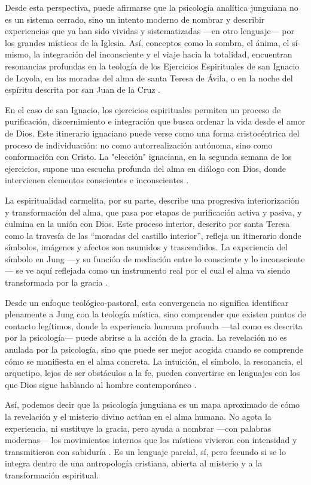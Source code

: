 \documentclass[a4paper,12pt]{article}
\begin{document}
Desde esta perspectiva, puede afirmarse que la psicología analítica junguiana no es un sistema cerrado, sino un intento moderno de nombrar y describir experiencias que ya han sido vividas y sistematizadas —en otro lenguaje— por los grandes místicos de la Iglesia. Así, conceptos como la sombra, el ánima, el sí-mismo, la integración del inconsciente y el viaje hacia la totalidad, encuentran resonancias profundas en la teología de los Ejercicios Espirituales de san Ignacio de Loyola, en las moradas del alma de santa Teresa de Ávila, o en la noche del espíritu descrita por san Juan de la Cruz \cite{jung1959,jung1971}.

En el caso de san Ignacio, los ejercicios espirituales permiten un proceso de purificación, discernimiento e integración que busca ordenar la vida desde el amor de Dios. Este itinerario ignaciano puede verse como una forma cristocéntrica del proceso de individuación: no como autorrealización autónoma, sino como conformación con Cristo. La "elección" ignaciana, en la segunda semana de los ejercicios, supone una escucha profunda del alma en diálogo con Dios, donde intervienen elementos conscientes e inconscientes \cite{jung1959,jung1971}.

La espiritualidad carmelita, por su parte, describe una progresiva interiorización y transformación del alma, que pasa por etapas de purificación activa y pasiva, y culmina en la unión con Dios. Este proceso interior, descrito por santa Teresa como la travesía de las “moradas del castillo interior”, refleja un itinerario donde símbolos, imágenes y afectos son asumidos y trascendidos. La experiencia del símbolo en Jung —y su función de mediación entre lo consciente y lo inconsciente— se ve aquí reflejada como un instrumento real por el cual el alma va siendo transformada por la gracia \cite{jung1964}.

Desde un enfoque teológico-pastoral, esta convergencia no significa identificar plenamente a Jung con la teología mística, sino comprender que existen puntos de contacto legítimos, donde la experiencia humana profunda —tal como es descrita por la psicología— puede abrirse a la acción de la gracia. La revelación no es anulada por la psicología, sino que puede ser mejor acogida cuando se comprende cómo se manifiesta en el alma concreta. La intuición, el símbolo, la resonancia, el arquetipo, lejos de ser obstáculos a la fe, pueden convertirse en lenguajes con los que Dios sigue hablando al hombre contemporáneo \cite{jung1959,jung1964}.

Así, podemos decir que la psicología junguiana es un mapa aproximado de cómo la revelación y el misterio divino actúan en el alma humana. No agota la experiencia, ni sustituye la gracia, pero ayuda a nombrar —con palabras modernas— los movimientos internos que los místicos vivieron con intensidad y transmitieron con sabiduría \cite{jung1959,jung1964}. Es un lenguaje parcial, sí, pero fecundo si se lo integra dentro de una antropología cristiana, abierta al misterio y a la transformación espiritual.
\end{document}
